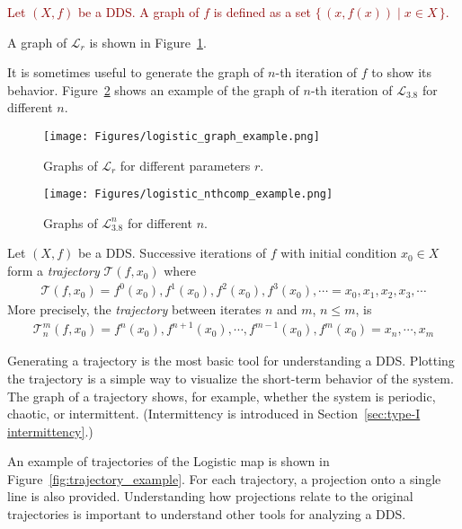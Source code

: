 \begin{definition}[Graph]
\textcolor{darkred}{
    Let $\left( X, f \right)$ be a DDS. A graph of $f$ is defined as a set $\{\, (x, f(x)) \mid x \in X \,\}$.
}
\end{definition}

\begin{remark}
    A graph of $\mathcal{L}_{r}$ is shown in Figure~\ref{fig:logistic_graph_example}.
    \par
    It is sometimes useful to generate the graph of $n$-th iteration of $f$ to show its behavior.
    Figure~\ref{fig:logistic_nthcomp_example} shows an example of the graph of $n$-th iteration of $\mathcal{L}_{3.8}$ for different $n$.
\end{remark}

\begin{figure}[!h]
    \centering
    \texttt{[image: Figures/logistic\_graph\_example.png]}
    \caption{
        Graphs of $\mathcal{L}_{r}$ for different parameters $r$.
    }
    \label{fig:logistic_graph_example}
\end{figure}

\begin{figure}[!h]
    \centering
    \texttt{[image: Figures/logistic\_nthcomp\_example.png]}
    \caption{
        Graphs of $\mathcal{L}_{3.8}^{n}$ for different $n$.
    }
    \label{fig:logistic_nthcomp_example}
\end{figure}

\begin{definition}[Trajectory]
    Let $\left( X, f \right)$ be a DDS. Successive iterations of $f$ with initial condition $x_0 \in X$ form a \emph{trajectory} $\mathcal{T}(f, x_0)$ where \begin{eqnarray}
        \mathcal{T}(f, x_0) = f^0(x_0), f^1(x_0), f^2(x_0), f^3(x_0), \cdots  = x_0, x_1, x_2, x_3, \cdots
    \end{eqnarray}
    More precisely, the \emph{trajectory} between iterates $n$ and $m$, $n \leq m$, is
    \begin{eqnarray}
        \mathcal{T}_{n}^{m}(f, x_0) = f^{n}(x_0), f^{n+1}(x_0), \cdots, f^{m-1}(x_0), f^{m}(x_0) = x_n, \cdots, x_m
    \end{eqnarray}
\end{definition}

\begin{remark}
    Generating a trajectory is the most basic tool for understanding a DDS.
    Plotting the trajectory is a simple way to visualize the short-term behavior of the system.
    The graph of a trajectory shows, for example, whether the system is periodic, chaotic, or intermittent. (Intermittency is introduced in Section~\ref{sec:type-I intermittency}.)
    \par
    An example of trajectories of the Logistic map is shown in Figure~\ref{fig:trajectory_example}.
    For each trajectory, a projection onto a single line is also provided.
    Understanding how projections relate to the original trajectories is important to understand other tools for analyzing a DDS.
\end{remark}

